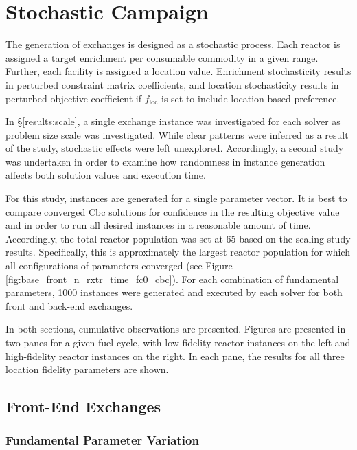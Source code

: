 
\section{Stochastic Campaign}\label{results:stochastic}

The generation of exchanges is designed as a stochastic process. Each reactor is
assigned a target enrichment per consumable commodity in a given range. Further,
each facility is assigned a location value. Enrichment stochasticity results in
perturbed constraint matrix coefficients, and location stochasticity results in
perturbed objective coefficient if $f_{\text{loc}}$ is set to include
location-based preference.

In \S \ref{results:scale}, a single exchange instance was investigated for each
solver as problem size scale was investigated. While clear patterns were
inferred as a result of the study, stochastic effects were left
unexplored. Accordingly, a second study was undertaken in order to examine how
randomness in instance generation affects both solution values and execution
time.

For this study, instances are generated for a single parameter vector. It is
best to compare converged Cbc solutions for confidence in the resulting
objective value and in order to run all desired instances in a reasonable amount
of time. Accordingly, the total reactor population was set at 65 based on the
scaling study results. Specifically, this is approximately the largest reactor
population for which all configurations of parameters converged (see Figure
\ref{fig:base_front_n_rxtr_time_fc0_cbc}). For each combination of fundamental
parameters, 1000 instances were generated and executed by each solver for both
front and back-end exchanges.

In both sections, cumulative observations are presented. Figures are presented
in two panes for a given fuel cycle, with low-fidelity reactor instances on the
left and high-fidelity reactor instances on the right. In each pane, the results
for all three location fidelity parameters are shown.

\subsection{Front-End Exchanges}

\subsubsection{Fundamental Parameter Variation}

